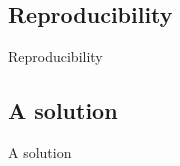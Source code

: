 \subsection[IntroRepro]{Reproducibility}
\begin{frame}
\huge{Reproducibility}
\end{frame}


\subsection[Solution]{A solution}
\begin{frame}
\huge{A solution}
\end{frame}


%

%

